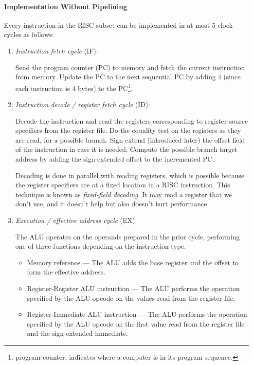 \documentclass[12pt, a4paper]{article}
\theoremstyle{margin}
\begin{document}
      \paragraph{Implementation Without Pipelining\cite{caqa}} 
        Every instruction in the RISC subset can be implemented in at most 5 clock cycles as follows:
        \begin{enumerate}
          \item \emph{Instruction fetch cycle} (IF):

          Send the program counter (PC) to memory and fetch the current instruction from memory. Update the PC to the next sequential PC by adding 4 (since each instruction is 4 bytes) to the PC\footnote{program counter, indicates where a computer is in its program sequence.}.

          \item \emph{Instruction decode / register fetch cycle} (ID):

          Decode the instruction and read the registers corresponding to register source specifiers from the register file. Do the equality test on the registers as they are read, for a possible branch. Sign-extend (introduced later) the offset field of the instruction in case it is needed. Compute the possible branch target address by adding the sign-extended offset to the incremented PC.

          Decoding is done in parallel with reading registers, which is possible because the register specifiers are at a fixed location in a RISC instruction. This technique is known as \emph{fixed-field decoding}. It may read a register that we don't use, and it doesn't help but also doesn't hurt performance.

          \item \emph{Execution / effective address cycle} (EX):

          The ALU operates on the operands prepared in the prior cycle, performing one of three functions depending on the instruction type.
          \begin{itemize}
            \item Memory reference --- The ALU adds the base register and the offset to form the effective address.
            \item Register-Register ALU instruction --- The ALU performs the operation specified by the ALU opcode on the values read from the register file.
            \item Register-Immediate ALU instruction --- The ALU performs the operation specified by the ALU opcode on the first value read from the register file and the sign-extended immediate.
          \end{itemize}


\end{enumerate}
\end{document}
